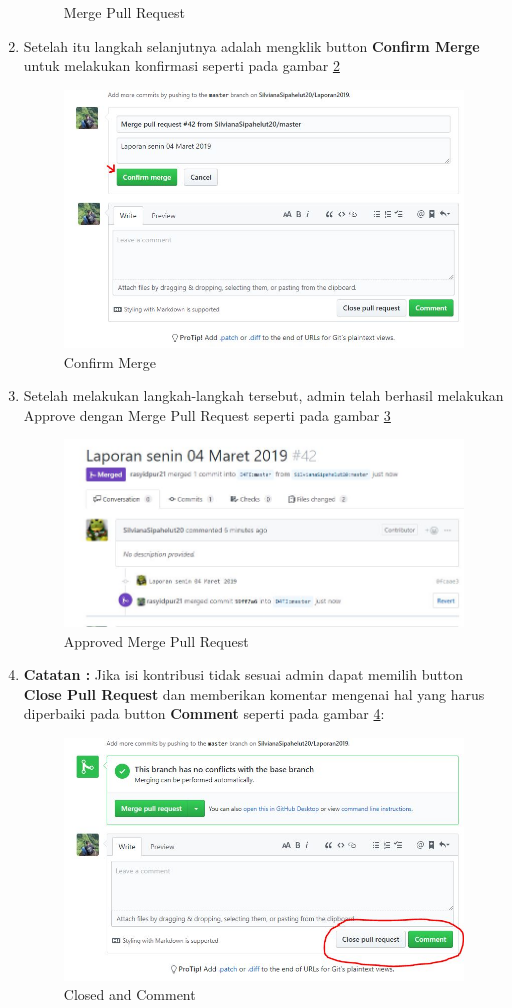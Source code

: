 \begin{enumerate}
\begin{figure}[!htbp]
\caption{Merge Pull Request}
\label{fig:mergepull}
\end{figure}
\item Setelah itu langkah selanjutnya adalah mengklik button \textbf{Confirm Merge} untuk melakukan konfirmasi seperti pada gambar \ref{fig:confirm}
\subitem
\begin{figure}[!htbp]
\centerline{\includegraphics[width=.75\textwidth]{Figures/membacapr/mr5.JPG}}
\caption{Confirm Merge}
\label{fig:confirm}
\end{figure}
\item Setelah melakukan langkah-langkah tersebut, admin telah berhasil melakukan Approve dengan Merge Pull Request seperti pada gambar \ref{fig:approvepull}
\subitem
\begin{figure}[!htbp]
\centerline{\includegraphics[width=.75\textwidth]{Figures/membacapr/mr6.JPG}}
\caption{Approved Merge Pull Request}
\label{fig:approvepull}
\end{figure}
\item \textbf{Catatan :} Jika isi kontribusi tidak sesuai admin dapat memilih button \textbf{Close Pull Request} dan memberikan komentar mengenai hal yang harus diperbaiki pada button \textbf{Comment} seperti pada gambar \ref{fig:closed}:
\subitem
\begin{figure}[!htbp]
\centerline{\includegraphics[width=.75\textwidth]{Figures/membacapr/mr4.JPG}}
\caption{Closed and Comment}
\label{fig:closed}
\end{figure}
\end{enumerate}
